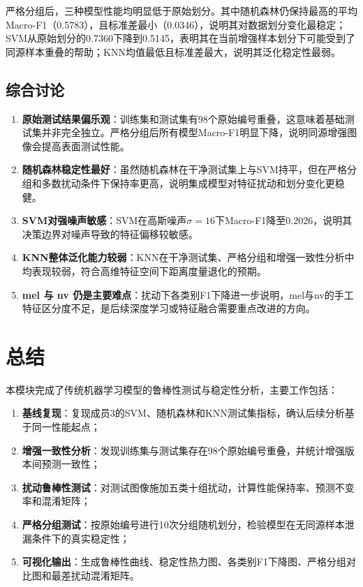 \documentclass[12pt,a4paper]{ctexart}
\begin{document}
严格分组后，三种模型性能均明显低于原始划分。其中随机森林仍保持最高的平均Macro-F1（0.5783），且标准差最小（0.0346），说明其对数据划分变化最稳定；SVM从原始划分的0.7360下降到0.5145，表明其在当前增强样本划分下可能受到了同源样本重叠的帮助；KNN均值最低且标准差最大，说明其泛化稳定性最弱。

\subsection{综合讨论}
\begin{enumerate}[label=(\arabic*)]
    \item \textbf{原始测试结果偏乐观}：训练集和测试集有98个原始编号重叠，这意味着基础测试集并非完全独立。严格分组后所有模型Macro-F1明显下降，说明同源增强图像会提高表面测试性能。
    \item \textbf{随机森林稳定性最好}：虽然随机森林在干净测试集上与SVM持平，但在严格分组和多数扰动条件下保持率更高，说明集成模型对特征扰动和划分变化更稳健。
    \item \textbf{SVM对强噪声敏感}：SVM在高斯噪声$\sigma=16$下Macro-F1降至0.2026，说明其决策边界对噪声导致的特征偏移较敏感。
    \item \textbf{KNN整体泛化能力较弱}：KNN在干净测试集、严格分组和增强一致性分析中均表现较弱，符合高维特征空间下距离度量退化的预期。
    \item \textbf{mel 与 nv 仍是主要难点}：扰动下各类别F1下降进一步说明，mel与nv的手工特征区分度不足，是后续深度学习或特征融合需要重点改进的方向。
\end{enumerate}

\section{总结}

本模块完成了传统机器学习模型的鲁棒性测试与稳定性分析，主要工作包括：
\begin{enumerate}[label=(\arabic*)]
    \item \textbf{基线复现}：复现成员3的SVM、随机森林和KNN测试集指标，确认后续分析基于同一性能起点；
    \item \textbf{增强一致性分析}：发现训练集与测试集存在98个原始编号重叠，并统计增强版本间预测一致性；
    \item \textbf{扰动鲁棒性测试}：对测试图像施加五类十组扰动，计算性能保持率、预测不变率和混淆矩阵；
    \item \textbf{严格分组测试}：按原始编号进行10次分组随机划分，检验模型在无同源样本泄漏条件下的真实稳定性；
    \item \textbf{可视化输出}：生成鲁棒性曲线、稳定性热力图、各类别F1下降图、严格分组对比图和最差扰动混淆矩阵。
\end{enumerate}
\end{document}
